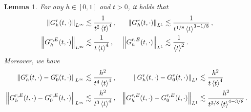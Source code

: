 \documentclass[10pt,a4paper]{amsart}
\newtheorem{lem}{Lemma}
\newcommand		{\Gr}			{G^{\textnormal{r}}}
\newcommand		{\GrE}			{G^{\textnormal{r},E}}
\newcommand		{\Nrm}[2]		{\nrm{#1}_{#2}}
\newcommand		{\bangle}[1]	{\lt\langle #1\rt\rangle}
\newcommand		{\eps}			{\varepsilon}
\newcommand	{\h}			{h}
\newcommand		{\lt}			{\left}				%
\newcommand		{\nrm}[1]		{\lt\lVert{#1}\rt\rVert}		%
\newcommand		{\rt}			{\right}			%
\newcommand		{\weight}[1]	{\bangle{#1}}	%
\begin{document}
	\begin{lem}\label{lem:decay_Gr}
		For any $h\in[0,1]$ and $t>0$, it holds that
		\begin{align*}
			\Nrm{\Gr_\h(t,\cdot)}{L^\infty} &\lesssim \frac{1}{t^2\weight{t}^4} \,  ,
			&
			\Nrm{\Gr_\h(t,\cdot)}{L^1} &\lesssim \frac{1}{t^{1/8}\weight{t}^{3-1/8}} \,  ,
			\\
			\Nrm{\GrE_\h(t,\cdot)}{L^\infty} &\lesssim \frac{1}{t\weight{t}^4} \,  ,
			&
			\Nrm{\GrE_\h(t,\cdot)}{L^1} &\lesssim \frac{1}{\weight{t}^{2}} \, . 
		\end{align*}
		Moreover, we have
		\begin{align*}
			\Nrm{\Gr_\h(t,\cdot) - \Gr_0(t,\cdot)}{L^\infty} &\lesssim \frac{h^2}{t^4\weight{t}^4} \, ,
			&
			\Nrm{\Gr_\h(t,\cdot) - \Gr_0(t,\cdot)}{L^1} &\lesssim \frac{h^{2}}{t\weight{t}^{4}} %
			\\
			\Nrm{\GrE_\h(t,\cdot) - \GrE_0(t,\cdot)}{L^\infty} &\lesssim \frac{h^2}{t^3\weight{t}^4} \, ,
			&
			\Nrm{\GrE_\h(t,\cdot) - \GrE_0(t,\cdot)}{L^1} &\lesssim \frac{h^{2}}{t^{3/8}\weight{t}^{4-3/8}} \, .
		\end{align*}
	\end{lem}
\end{document}

